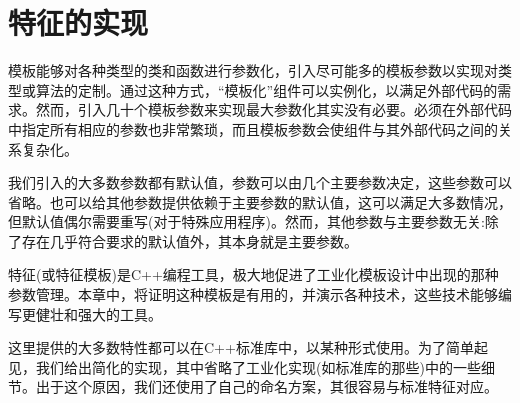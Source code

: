 \chapter{特征的实现}
模板能够对各种类型的类和函数进行参数化，引入尽可能多的模板参数以实现对类型或算法的定制。通过这种方式，“模板化”组件可以实例化，以满足外部代码的需求。然而，引入几十个模板参数来实现最大参数化其实没有必要。必须在外部代码中指定所有相应的参数也非常繁琐，而且模板参数会使组件与其外部代码之间的关系复杂化。

我们引入的大多数参数都有默认值，参数可以由几个主要参数决定，这些参数可以省略。也可以给其他参数提供依赖于主要参数的默认值，这可以满足大多数情况，但默认值偶尔需要重写(对于特殊应用程序)。然而，其他参数与主要参数无关:除了存在几乎符合要求的默认值外，其本身就是主要参数。

特征(或特征模板)是C++编程工具，极大地促进了工业化模板设计中出现的那种参数管理。本章中，将证明这种模板是有用的，并演示各种技术，这些技术能够编写更健壮和强大的工具。

这里提供的大多数特性都可以在C++标准库中，以某种形式使用。为了简单起见，我们给出简化的实现，其中省略了工业化实现(如标准库的那些)中的一些细节。出于这个原因，我们还使用了自己的命名方案，其很容易与标准特征对应。










